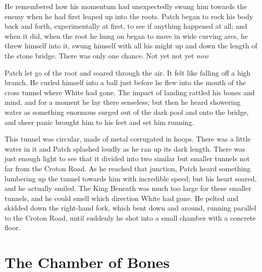 \documentclass[12pt]{book}
\begin{document}
 He remembered how his momentum had unexpectedly swung him towards the enemy when he had first leaped up into the roots. Patch began to rock his body back and forth, experimentally at first, to see if anything happened at all; and when it did, when the root he hung on began to move in wide curving arcs, he threw himself into it, swung himself with all his might up and down the length of the stone bridge. There was only one chance. Not yet %
 not yet %
 {\it now} %
\par
 Patch let go of the root and soared through the air. It felt like falling off a high branch. He curled himself into a ball just before he flew into the mouth of the cross tunnel where White had gone. The impact of landing rattled his bones and mind, and for a moment he lay there senseless; but then he heard showering water as something enormous surged out of the dark pool and onto the bridge, and sheer panic brought him to his feet and set him running.\par
 This tunnel was circular, made of metal corrugated in hoops. There was a little water in it and Patch splashed loudly as he ran up its dark length. There was just enough light to see that it divided into two similar but smaller tunnels not far from the Croton Road. As he reached that junction, Patch heard something lumbering up the tunnel towards him with incredible speed; but his heart soared, and he actually smiled. The King Beneath was much too large for these smaller tunnels, and he could smell which direction White had gone. He pelted and skidded down the right-hand fork, which bent down and around, running parallel to the Croton Road, until suddenly he shot into a small chamber with a concrete floor.\par

\section{The Chamber of Bones}
\end{document}
